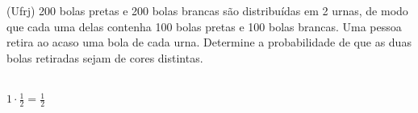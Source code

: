 \begin{ex}
(Ufrj) 200 bolas pretas e 200 bolas brancas são distribuídas em 2 urnas, de modo que cada uma delas contenha 100 bolas pretas e 100 bolas brancas. Uma pessoa retira ao acaso uma bola de cada urna. Determine a probabilidade de que as duas bolas retiradas sejam de cores distintas.
 \begin{sol}
  \phantom{A} \\
  $1\cdot\frac{1}{2}=\frac{1}{2}$
 \end{sol}
\end{ex}